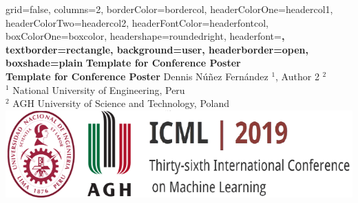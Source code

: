 \documentclass[a1paper,portrait,fontscale=0.410]{baposter}
\begin{document}
\begin{poster}{
grid=false,
columns=2,
borderColor=bordercol, %
headerColorOne=headercol1, %
headerColorTwo=headercol2, %
headerFontColor=headerfontcol, %
boxColorOne=boxcolor, %
headershape=roundedright, %
headerfont=\Large\sf\bf, %
textborder=rectangle,
background=user,
headerborder=open, %
boxshade=plain
}
{}
%
%
{\sf\bf Template for Conference Poster \\ Template for Conference Poster} %
{\vspace{0.2em} Dennis N\'u\~nez Fern\'andez $^1$, Author 2 $^2$ \\ %
{\smaller $^1$ National University of Engineering, Peru \\ $^2$ AGH University of Science and Technology, Poland}} %
{\includegraphics[scale=0.4]{logo}} %




\end{poster}
\end{document}

